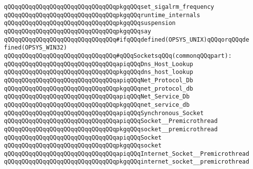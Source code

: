 \verb|qQQqqQQqqQQqqQQqqQQqqQQqqQQqqQQqpkgqQQqset_sigalrm_frequency|\newline
\verb|qQQqqQQqqQQqqQQqqQQqqQQqqQQqqQQqpkgqQQqruntime_internals|\newline
\verb|qQQqqQQqqQQqqQQqqQQqqQQqqQQqqQQqpkgqQQqsuspension|\newline
\verb|qQQqqQQqqQQqqQQqqQQqqQQqqQQqqQQqpkgqQQqsay|\newline
\newline
\newline
\newline
\verb|qQQqqQQqqQQqqQQqqQQqqQQqqQQqqQQq#ifqQQqdefined(OPSYS_UNIX)qQQqorqQQqdefined(OPSYS_WIN32)|\newline
\newline
\verb|qQQqqQQqqQQqqQQqqQQqqQQqqQQqqQQq#qQQqSocketsqQQq(commonqQQqpart):|\newline
\newline
\verb|qQQqqQQqqQQqqQQqqQQqqQQqqQQqqQQqapiqQQqDns_Host_Lookup|\newline
\verb|qQQqqQQqqQQqqQQqqQQqqQQqqQQqqQQqpkgqQQqdns_host_lookup|\newline
\newline
\verb|qQQqqQQqqQQqqQQqqQQqqQQqqQQqqQQqapiqQQqNet_Protocol_Db|\newline
\verb|qQQqqQQqqQQqqQQqqQQqqQQqqQQqqQQqpkgqQQqnet_protocol_db|\newline
\newline
\verb|qQQqqQQqqQQqqQQqqQQqqQQqqQQqqQQqapiqQQqNet_Service_Db|\newline
\verb|qQQqqQQqqQQqqQQqqQQqqQQqqQQqqQQqpkgqQQqnet_service_db|\newline
\newline
\verb|qQQqqQQqqQQqqQQqqQQqqQQqqQQqqQQqapiqQQqSynchronous_Socket|\newline
\newline
\verb|qQQqqQQqqQQqqQQqqQQqqQQqqQQqqQQqapiqQQqSocket__Premicrothread|\newline
\verb|qQQqqQQqqQQqqQQqqQQqqQQqqQQqqQQqpkgqQQqsocket__premicrothread|\newline
\newline
\verb|qQQqqQQqqQQqqQQqqQQqqQQqqQQqqQQqapiqQQqSocket|\newline
\verb|qQQqqQQqqQQqqQQqqQQqqQQqqQQqqQQqpkgqQQqsocket|\newline
\newline
\verb|qQQqqQQqqQQqqQQqqQQqqQQqqQQqqQQqapiqQQqInternet_Socket__Premicrothread|\newline
\verb|qQQqqQQqqQQqqQQqqQQqqQQqqQQqqQQqpkgqQQqinternet_socket__premicrothread|\newline

